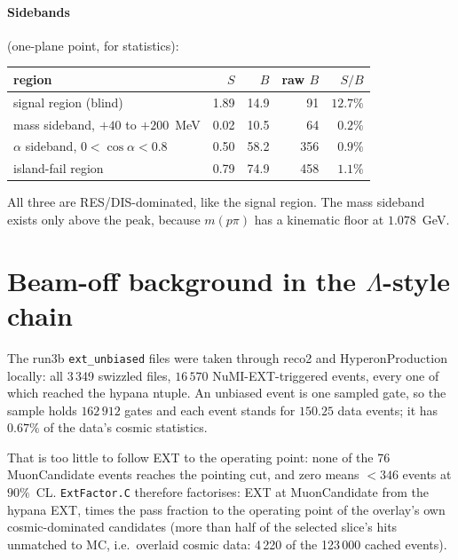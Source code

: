 \documentclass[11pt,a4paper]{article}
\newcommand{\Lam}{\ensuremath{\Lambda}}
\begin{document}
\paragraph{Sidebands} (one-plane point, for statistics):

\begin{center}
\begin{tabular}{lrrrr}
\toprule
region & $S$ & $B$ & raw $B$ & $S/B$ \\
\midrule
signal region (blind)                    & 1.89 & 14.9 &  91 & $12.7\%$ \\
mass sideband, $+40$ to $+200$~MeV        & 0.02 & 10.5 &  64 & $0.2\%$ \\
$\alpha$ sideband, $0<\cos\alpha<0.8$    & 0.50 & 58.2 & 356 & $0.9\%$ \\
island-fail region                       & 0.79 & 74.9 & 458 & $1.1\%$ \\
\bottomrule
\end{tabular}
\end{center}

\noindent All three are RES/DIS-dominated, like the signal region. The mass sideband
exists only above the peak, because $m(p\pi)$ has a kinematic floor at $1.078$~GeV.

\section{Beam-off background in the \Lam-style chain}
\label{sec:ext}

The run3b \texttt{ext\_unbiased} files were taken through reco2 and
HyperonProduction locally: all 3\,349 swizzled files, $16\,570$ NuMI-EXT-triggered
events, every one of which reached the hypana ntuple. An unbiased event is one sampled
gate, so the sample holds $162\,912$ gates and each event stands for $150.25$ data
events; it has $0.67\%$ of the data's cosmic statistics.

That is too little to follow EXT to the operating point: none of the 76
MuonCandidate events reaches the pointing cut, and zero means $<346$ events at
$90\%$~CL. \texttt{ExtFactor.C} therefore factorises: EXT at MuonCandidate from the
hypana EXT, times the pass fraction to the operating point of the overlay's own
cosmic-dominated candidates (more than half of the selected slice's hits unmatched to
MC, i.e.\ overlaid cosmic data: 4\,220 of the 123\,000 cached events).
\end{document}
